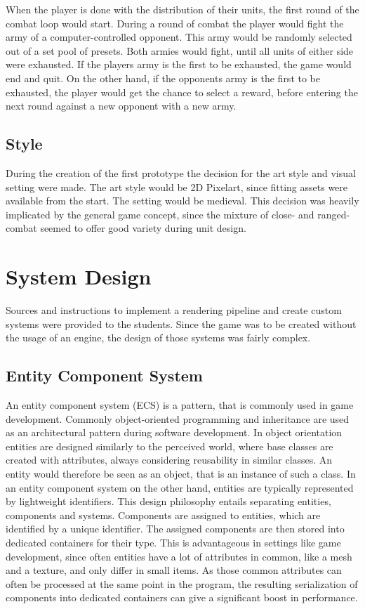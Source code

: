 \documentclass[conference]{IEEEtran}
\begin{document}
When the player is done with the distribution of their units, the first round of the combat loop would start.
During a round of combat the player would fight the army of a computer-controlled opponent.
This army would be randomly selected out of a set pool of presets.
Both armies would fight, until all units of either side were exhausted.
If the players army is the first to be exhausted, the game would end and quit.
On the other hand, if the opponents army is the first to be exhausted, the player would get the chance to select
a reward, before entering the next round against a new opponent with a new army.

\subsection{Style}
During the creation of the first prototype the decision for the art style and visual setting were made.
The art style would be 2D Pixelart, since fitting assets were available from the start.
The setting would be medieval.
This decision was heavily implicated by the general game concept, since the mixture of close- and ranged-combat
seemed to offer good variety during unit design.

\section{System Design}
Sources and instructions to implement a rendering pipeline and create custom systems were provided to the students.
Since the game was to be created without the usage of an engine, the design of those systems was fairly complex.

\subsection{Entity Component System}
An entity component system (ECS) is a pattern, that is commonly used in game development.
Commonly object-oriented programming and inheritance are used as an architectural pattern during software development.
In object orientation entities are designed similarly to the perceived world, where base classes are created with
attributes, always considering reusability in similar classes.
An entity would therefore be seen as an object, that is an instance of such a class.
In an entity component system on the other hand, entities are typically represented by lightweight identifiers.
This design philosophy entails separating entities, components and systems.
Components are assigned to entities, which are identified by a unique identifier.
The assigned components are then stored into dedicated containers for their type.
This is advantageous in settings like game development, since often entities have a lot of attributes in common, like
a mesh and a texture, and only differ in small items.
As those common attributes can often be processed at the same point in the program, the resulting serialization of
components into dedicated containers can give a significant boost in performance.
\end{document}
